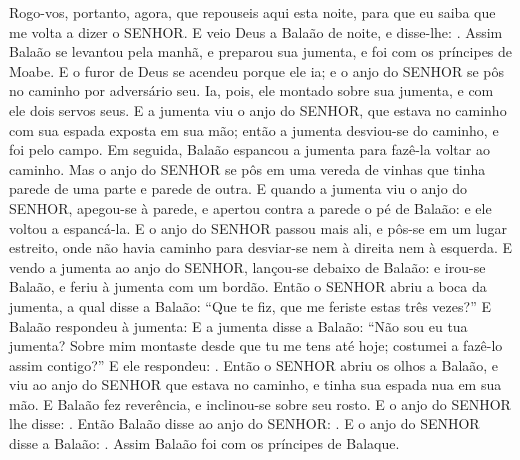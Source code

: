{{  Rogo-vos, portanto, agora, que repouseis aqui esta noite, para que eu saiba que me volta a dizer o SENHOR}.
  E veio Deus a Balaão de noite, e disse-lhe: .
  Assim Balaão se levantou pela manhã, e preparou sua jumenta, e foi com os príncipes de Moabe.
  E o furor de Deus se acendeu porque ele ia; e o anjo do SENHOR se pôs no caminho por adversário seu. Ia, pois, ele montado sobre sua jumenta, e com ele dois servos seus.
  E a jumenta viu o anjo do SENHOR, que estava no caminho com sua espada exposta em sua mão; então a jumenta desviou-se do caminho, e foi pelo campo. Em seguida, Balaão espancou a jumenta para fazê-la voltar ao caminho.
  Mas o anjo do SENHOR se pôs em uma vereda de vinhas que tinha parede de uma parte e parede de outra.
  E quando a jumenta viu o anjo do SENHOR, apegou-se à parede, e apertou contra a parede o pé de Balaão: e ele voltou a espancá-la.
  E o anjo do SENHOR passou mais ali, e pôs-se em um lugar estreito, onde não havia caminho para desviar-se nem à direita nem à esquerda.
  E vendo a jumenta ao anjo do SENHOR, lançou-se debaixo de Balaão: e irou-se Balaão, e feriu à jumenta com um bordão.
  Então o SENHOR abriu a boca da jumenta, a qual disse a Balaão: \enquote{Que te fiz, que me feriste estas três vezes?}
  E Balaão respondeu à jumenta: 
  E a jumenta disse a Balaão: \enquote{Não sou eu tua jumenta? Sobre mim montaste desde que tu me tens até hoje; costumei a fazê-lo assim contigo?} E ele respondeu: .
  Então o SENHOR abriu os olhos a Balaão, e viu ao anjo do SENHOR que estava no caminho, e tinha sua espada nua em sua mão. E Balaão fez reverência, e inclinou-se sobre seu rosto.
  E o anjo do SENHOR lhe disse: .
  Então Balaão disse ao anjo do SENHOR: .
  E o anjo do SENHOR disse a Balaão: . Assim Balaão foi com os príncipes de Balaque.
}
